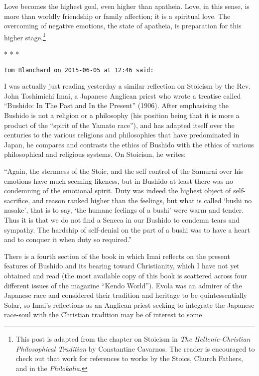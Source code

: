 Love becomes the highest goal, even higher than apatheia. Love, in this sense, is more than worldly friendship or family
affection; it is a spiritual love. The overcoming of negative emotions, the state of apatheia, is preparation for this
higher stage.\footnote{This post is adapted from the chapter on Stoicism in \textit{The Hellenic-Christian Philosophical Tradition} by Constantine
Cavarnos. The reader is encouraged to check out that work for references to works by the Stoics, Church Fathers, and in
the \textit{Philokalia}.}


\begin{center}* * *\end{center}

\begin{footnotesize}\begin{sffamily}

\texttt{Tom Blanchard on 2015-06-05 at 12:46 said: }

I was actually just reading yesterday a similar reflection on Stoicism by the Rev. John Toshimichi Imai, a Japanese
Anglican priest who wrote a treatise called “Bushido: In The Past and In the Present” (1906). After emphasising the
Bushido is not a religion or a philosophy (his position being that it is more a product of the “spirit of the Yamato
race”), and has adapted itself over the centuries to the various religions and philosophies that have predominated in
Japan, he compares and contrasts the ethics of Bushido with the ethics of various philosophical and religious systems.
On Stoicism, he writes:

“Again, the sternness of the Stoic, and the self control of the Samurai over his emotions have much seeming likeness,
but in Bushido at least there was no condemning of the emotional spirit. Duty was indeed the highest object of
self-sacrifice, and reason ranked higher than the feelings, but what is called ‘bushi no
nasake’, that is to say, `the humane feelings of a bushi’ were warm and tender.
Thus it is that we do not find a Seneca in our Bushido to condemn tears and sympathy. The hardship of self-denial on
the part of a bushi was to have a heart and to conquer it when duty so required.”

There is a fourth section of the book in which Imai reflects on the present features of Bushido and its bearing toward
Christianity, which I have not yet obtained and read (the most available copy of this book is scattered across four
different issues of the magazine “Kendo World”). Evola was an admirer of the Japanese race and considered their
tradition and heritage to be quintessentially Solar, so Imai’s reflections as an Anglican priest seeking to
integrate the Japanese race-soul with the Christian tradition may be of interest to some.

\end{sffamily}\end{footnotesize}